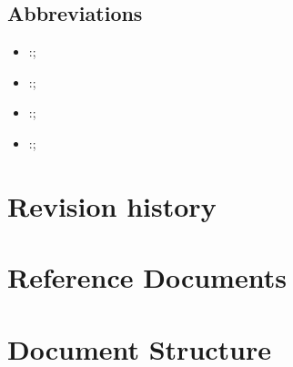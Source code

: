 \subsection{Abbreviations}
\begin{itemize}
\item \textbf{}:;
\item \textbf{}:;
\item \textbf{}:;
\item \textbf{}:;


\end{itemize}


\section{Revision history}
\section{Reference Documents}
\section{Document Structure}
